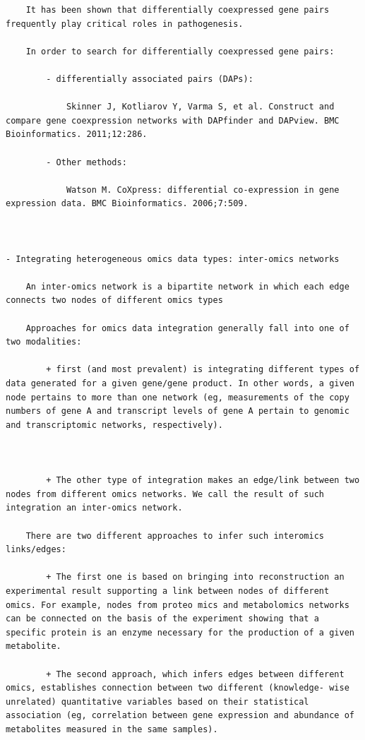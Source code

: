 \documentclass[
]{book}
\begin{document}
\begin{verbatim}
    It has been shown that differentially coexpressed gene pairs frequently play critical roles in pathogenesis.

    In order to search for differentially coexpressed gene pairs:

        - differentially associated pairs (DAPs):

            Skinner J, Kotliarov Y, Varma S, et al. Construct and compare gene coexpression networks with DAPfinder and DAPview. BMC Bioinformatics. 2011;12:286.

        - Other methods:

            Watson M. CoXpress: differential co-expression in gene expression data. BMC Bioinformatics. 2006;7:509.



- Integrating heterogeneous omics data types: inter-omics networks

    An inter-omics network is a bipartite network in which each edge connects two nodes of different omics types

    Approaches for omics data integration generally fall into one of two modalities:

        + first (and most prevalent) is integrating different types of data generated for a given gene/gene product. In other words, a given node pertains to more than one network (eg, measurements of the copy numbers of gene A and transcript levels of gene A pertain to genomic and transcriptomic networks, respectively).



        + The other type of integration makes an edge/link between two nodes from different omics networks. We call the result of such integration an inter-omics network.

    There are two different approaches to infer such interomics links/edges:

        + The first one is based on bringing into reconstruction an experimental result supporting a link between nodes of different omics. For example, nodes from proteo mics and metabolomics networks can be connected on the basis of the experiment showing that a specific protein is an enzyme necessary for the production of a given metabolite.

        + The second approach, which infers edges between different omics, establishes connection between two different (knowledge- wise unrelated) quantitative variables based on their statistical association (eg, correlation between gene expression and abundance of metabolites measured in the same samples).




\end{verbatim}
\end{document}
